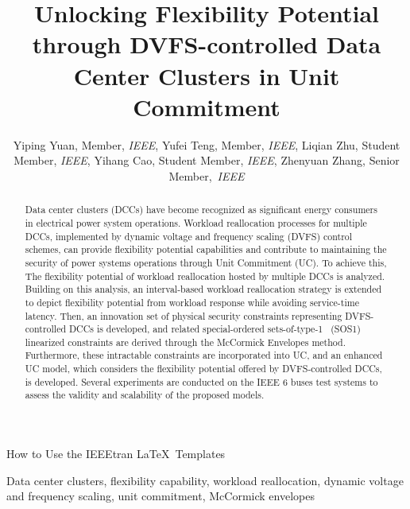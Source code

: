 \documentclass[lettersize,journal]{IEEEtran}
\begin{document}
\title{\fontsize{22pt}{24pt}\selectfont Unlocking Flexibility Potential through DVFS-controlled Data Center Clusters in Unit Commitment}
\author{Yiping Yuan, Member, \textit{IEEE}, Yufei Teng, Member, \textit{IEEE}, Liqian Zhu, Student Member, \textit{IEEE}, Yihang Cao, Student Member, \textit{IEEE}, Zhenyuan Zhang, Senior Member,~\textit{IEEE}
}

\IEEEaftertitletext{\vspace{-1.0\baselineskip}}

%
{How to Use the IEEEtran \LaTeX \ Templates}

\maketitle

\begin{abstract}
	Data center clusters (DCCs) have become recognized as significant energy consumers in electrical power system operations. Workload reallocation processes for multiple DCCs, implemented by dynamic voltage and frequency scaling (DVFS) control schemes, can provide flexibility potential capabilities and contribute to maintaining the security of power systems operations through Unit Commitment (UC). To achieve this,
	The flexibility potential of workload reallocation hosted by multiple DCCs is analyzed. Building on this analysis, an interval-based workload reallocation strategy is extended to depict flexibility potential from workload response while avoiding service-time latency. Then, an innovation set of physical security constraints representing DVFS-controlled DCCs is developed, and related special-ordered sets-of-type-1 ~(SOS1) linearized constraints are derived through the McCormick Envelopes method. Furthermore, these intractable constraints are incorporated into UC, and an enhanced UC model, which considers the flexibility potential offered by DVFS-controlled DCCs, is developed. Several experiments are conducted on the IEEE 6 buses test systems to assess the validity and scalability of the proposed models.

\end{abstract}

\begin{IEEEkeywords}
	Data center clusters, flexibility capability, workload reallocation, dynamic voltage and frequency scaling, unit commitment, McCormick envelopes
\end{IEEEkeywords}
\end{document}

